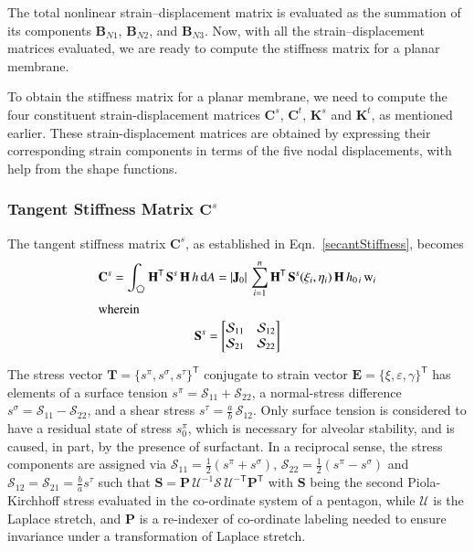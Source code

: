 The total nonlinear strain--displacement matrix is evaluated as the summation of its components $ \mathbf{B}_{N1}$, $\mathbf{B}_{N2}$, and $\mathbf{B}_{N3}$. Now, with all the strain--displacement matrices evaluated, we are ready to compute the stiffness matrix for a planar membrane.

To obtain the stiffness matrix for a planar membrane, we need to compute the four constituent strain-displacement matrices $\mathbf{C}^s$, $\mathbf{C}^t$, $\mathbf{K}^s$ and $\mathbf{K}^t$, as mentioned earlier. These strain-displacement matrices are obtained by expressing their corresponding strain components in terms of the five nodal displacements, with help from the shape functions.


\subsubsection{Tangent Stiffness Matrix $\mathbf{C}^s$}

The tangent stiffness matrix $\mathbf{C}^s$, as established in Eqn.~\eqref{secantStiffness}, becomes 
\begin{subequations}
	\begin{gather}
		\mathbf{C}^s = \int_{\pentagon} \mathbf{H}^{\mathsf{T}} \,  \mathbf{S}^s \, \mathbf{H} \, h \, \mathrm{d} A
		=  | \mathbf{J}_0 |  \, \sum_{i=1}^{n} \mathbf{H}^{\mathsf{T}} \, \mathbf{S}^s (\xi_i , \eta_i) \, \mathbf{H} \, h_{0\,i} \, \mathrm{w}_i \\
        \intertext{wherein}
        \mathbf{S}^s = \begin{bmatrix}
        	\mathcal{S}_{11} & \mathcal{S}_{12} \\
        	\mathcal{S}_{21} & \mathcal{S}_{22}
        \end{bmatrix}
    \label{stressMtx2D}
	\end{gather}
\end{subequations}

The stress vector $\boldsymbol{T} = \{ s^{\pi}, s^{\sigma}, s^{\tau} \}^{\mathsf{T}}$ conjugate to strain vector $\boldsymbol{E} = \{ \xi, \varepsilon, \gamma \}^{\mathsf{T}}$ has elements of a surface tension $s^{\pi} = \mathcal{S}_{11} + \mathcal{S}_{22}$, a normal-stress difference $s^{\sigma} = \mathcal{S}_{11} - \mathcal{S}_{22}$, and a shear stress $s^{\tau} = \tfrac{a}{b} \, \mathcal{S}_{12}$.  Only surface tension is considered to have a residual state of stress $s^{\pi}_0$, which is necessary for alveolar stability, and is caused, in part, by the presence of surfactant.  In a reciprocal sense, the stress components are assigned via $\mathcal{S}_{11} = \frac{1}{2} ( s^{\pi} + s^{\sigma} )$, $\mathcal{S}_{22} = \frac{1}{2} ( s^{\pi} - s^{\sigma} )$ and $\mathcal{S}_{12} = \mathcal{S}_{21} = \frac{b}{a} s^{\tau}$ such that $\mathbf{S} = \mathbf{P} \, \boldsymbol{\mathcal{U}}^{-1} \boldsymbol{\mathcal{S}} \, \boldsymbol{\mathcal{U}}^{-\mathsf{T}} \mathbf{P}^{\mathsf{T}}$ with $\mathbf{S}$ being the second Piola-Kirchhoff stress evaluated in the co-ordinate system of a pentagon, while $\boldsymbol{\mathcal{U}}$ is the Laplace stretch, and $\mathbf{P}$ is a re-indexer of co-ordinate labeling needed to ensure invariance under a transformation of Laplace stretch.


